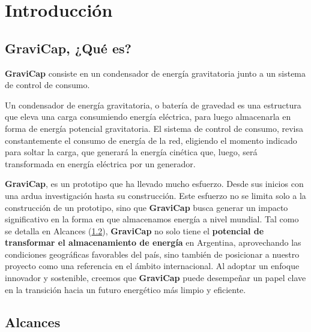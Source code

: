 \chapter{Introducción}
    
        \section{\textcolor{dark_violet}{\textbf{GraviCap}}, ¿Qué es?}
            \textcolor{dark_violet}{\textbf{GraviCap}} consiste en un condensador de energía gravitatoria junto a un sistema de control de consumo.\par
            Un condensador de energía gravitatoria, o batería de gravedad es una estructura que eleva una carga consumiendo energía eléctrica, para luego almacenarla en forma de energía potencial gravitatoria. El sistema de control de consumo, revisa constantemente el consumo de energía de la red, eligiendo el momento indicado para soltar la carga, que generará la energía cinética que, luego, será transformada en energía eléctrica por un generador.\par
            \textcolor{dark_violet}{\textbf{GraviCap}}, es un prototipo que ha llevado mucho esfuerzo. Desde sus inicios con una ardua investigación hasta su construcción. Este esfuerzo no se limita solo a la construcción de un prototipo, sino que \textcolor{dark_violet}{\textbf{GraviCap}} busca generar un impacto significativo en la forma en que almacenamos energía a nivel mundial. Tal como se detalla en Alcances (\ref{Alc}), \textcolor{dark_violet}{\textbf{GraviCap}} no solo tiene el \textbf{potencial de transformar el almacenamiento de energía} en Argentina, aprovechando las condiciones geográficas favorables del país, sino también de posicionar a nuestro proyecto como una referencia en el ámbito internacional. Al adoptar un enfoque innovador y sostenible, creemos que \textcolor{dark_violet}{\textbf{GraviCap}} puede desempeñar un papel clave en la transición hacia un futuro energético más limpio y eficiente.\par

        \section{Alcances}
        \label{Alc}
